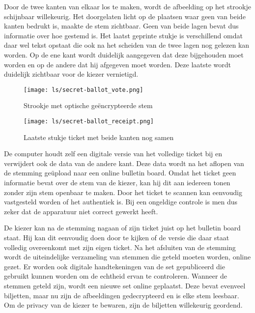 \npar Door de twee kanten van elkaar los te maken, wordt de afbeelding op het strookje schijnbaar willekeurig. Het doorgelaten licht op de plaatsen waar geen van beide kanten bedrukt is, maakte de stem zichtbaar. Geen van beide lagen bevat dus informatie over hoe gestemd is. Het laatst geprinte stukje is verschillend omdat daar wel tekst opstaat die ook na het scheiden van de twee lagen nog gelezen kan worden. Op de ene kant wordt duidelijk aangegeven dat deze bijgehouden moet worden en op de andere dat hij afgegeven moet worden. Deze laatste wordt duidelijk zichtbaar voor de kiezer vernietigd.

\begin{figure}
  \centering
  \texttt{[image: ls/secret-ballot\_vote.png]}
  \caption[Strookje met optische ge\"encrypteerde stem]{Strookje met optische ge\"encrypteerde stem~\cite{chaum_secret_ballot}}
  \label{fig:ls:secret_ballot_vote}
\end{figure}

\begin{figure}
  \centering
  \texttt{[image: ls/secret-ballot\_receipt.png]}
  \caption[Laatste stukje ticket met beide kanten nog samen]{Laatste stukje ticket met beide kanten nog samen~\cite{chaum_secret_ballot}}
  \label{fig:ls:secret_ballot_receipt}
\end{figure}

\npar De computer houdt zelf een digitale versie van het volledige ticket bij en verwijdert ook de data van de andere kant. Deze data wordt na het aflopen van de stemming ge\"upload naar een online bulletin board. Omdat het ticket geen informatie bevat over de stem van de kiezer, kan hij dit aan iedereen tonen zonder zijn stem openbaar te maken. Door het ticket te scannen kan eenvoudig vastgesteld worden of het authentiek is. Bij een ongeldige controle is men dus zeker dat de apparatuur niet correct gewerkt heeft.

\npar De kiezer kan na de stemming nagaan of zijn ticket juist op het bulletin board staat. Hij kan dit eenvoudig doen door te kijken of de versie die daar staat volledig overeenkomt met zijn eigen ticket. Na het afsluiten van de stemming wordt de uiteindelijke verzameling van stemmen die geteld moeten worden, online gezet. Er worden ook digitale handtekeningen van de set gepubliceerd die gebruikt kunnen worden om de echtheid ervan te controleren. Wanneer de stemmen geteld zijn, wordt een nieuwe set online geplaatst. Deze bevat evenveel biljetten, maar nu zijn de afbeeldingen gedecrypteerd en is elke stem leesbaar. Om de privacy van de kiezer te bewaren, zijn de biljetten willekeurig geordend.

